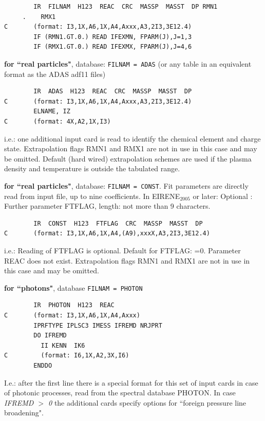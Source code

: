 \begin{lstlisting}
        IR  FILNAM  H123  REAC  CRC  MASSP  MASST  DP RMN1
     .    RMX1
C       (format: I3,1X,A6,1X,A4,Axxx,A3,2I3,3E12.4)
        IF (RMN1.GT.0.) READ IFEXMN, FPARM(J),J=1,3
        IF (RMX1.GT.0.) READ IFEXMX, FPARM(J),J=4,6
\end{lstlisting}

\textbf{for ``real particles"}, database: \lstinline|FILNAM = ADAS| (or any table
in an equivalent format as the \ac{ADAS} adf11 files)

\begin{lstlisting}
        IR  ADAS  H123  REAC  CRC  MASSP  MASST  DP
C       (format: I3,1X,A6,1X,A4,Axxx,A3,2I3,3E12.4)
        ELNAME, IZ
C       (format: 4X,A2,1X,I3)
\end{lstlisting}

i.e.: one additional input card is read to identify the chemical element and
charge state.
Extrapolation flags RMN1 and RMX1 are not in use in this case and may be
omitted.
Default (hard wired) extrapolation schemes are used if the plasma density and
temperature is outside the tabulated range.
\vspace{0.3cm}

\textbf{for ``real particles"}, database: \lstinline|FILNAM = CONST|.
Fit parameters are directly read from input file, up to nine coefficients.
In EIRENE$_{2005}$ or later: Optional : Further parameter FTFLAG, length: not
more than 9 characters.

\begin{lstlisting}
        IR  CONST  H123  FTFLAG  CRC  MASSP  MASST  DP
C       (format: I3,1X,A6,1X,A4,(A9),xxxX,A3,2I3,3E12.4)
\end{lstlisting}

i.e.: Reading of FTFLAG is optional.
Default for FTFLAG: =0.
Parameter REAC does not exist.
Extrapolation flags RMN1 and RMX1 are not in use in this case and may be
omitted.

\vspace{0.3cm}
\textbf{for ``photons"}, database \lstinline|FILNAM = PHOTON|

\begin{lstlisting}
        IR  PHOTON  H123  REAC
C       (format: I3,1X,A6,1X,A4,Axxx)
        IPRFTYPE IPLSC3 IMESS IFREMD NRJPRT
        DO IFREMD
          II KENN  IK6
C         (format: I6,1X,A2,3X,I6)
        ENDDO
\end{lstlisting}

I.e.: after the first line there is a special format for this set of input
cards in case of photonic processes, read from the spectral database PHOTON.
In case \emph{IFREMD $>$ 0} the additional cards specify options for ``foreign
pressure line broadening".

